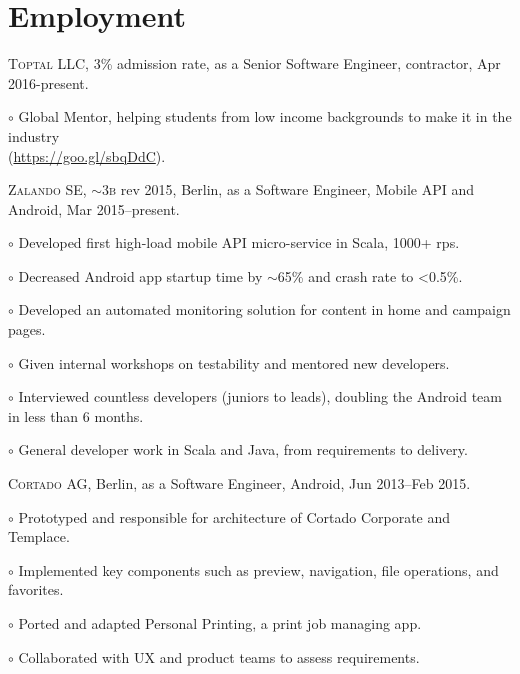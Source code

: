 \documentclass[letterpaper]{article}
\renewenvironment{itemize}{
  \begin{list}{}{
    \setlength{\leftmargin}{1.5em}
  }
}{
  \end{list}
}
\newenvironment{no-indent-itemize}{
  \begin{list}{}{
    \setlength{\leftmargin}{0em}
  }
}{
  \end{list}
}
\def\tilde{$\scriptstyle\sim$}
\def\bullet{$\circ$\xspace}
\begin{document}
\section*{Employment}
\begin{no-indent-itemize}
  \item \textsc{Toptal LLC}, 3\% admission rate, as a Senior Software Engineer, contractor, Apr 2016-present.
  \begin{itemize}
    \item\bullet Global Mentor, helping students from low income backgrounds to make it in the industry \\  
    \phantom{\bullet }(\href{https://goo.gl/sbqDdC}{https://goo.gl/sbqDdC}).
  \end{itemize}
  \item \textsc{Zalando SE}, \tilde 3\textsc{b} rev 2015, Berlin, as a Software Engineer, 
         Mobile API and Android, Mar 2015--present. 
  \begin{itemize}
	\item\bullet Developed first high-load mobile API micro-service in Scala, 1000+ rps.
	\item\bullet Decreased Android app startup time by \tilde 65\% and crash rate to <0.5\%.
	\item\bullet Developed an automated monitoring solution for content in home and campaign pages.
	\item\bullet Given internal workshops on testability and mentored new developers.
	\item\bullet Interviewed countless developers (juniors to leads), doubling the Android team in less than 6 months.	
	\item\bullet General developer work in Scala and Java, from requirements to delivery.
  \end{itemize}
  \item \textsc{Cortado AG}, Berlin, as a Software Engineer, Android, Jun 2013--Feb 2015.
  \begin{itemize}
    \item\bullet Prototyped and responsible for architecture of Cortado Corporate and Templace.
    \item\bullet Implemented key components such as preview, navigation, file operations, and favorites.
    \item\bullet Ported and adapted Personal Printing, a print job managing app.
    \item\bullet Collaborated with UX and product teams to assess requirements.
  \end{itemize}

\end{no-indent-itemize}
\end{document}
